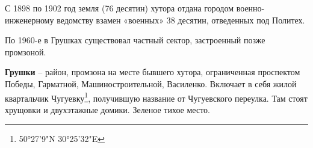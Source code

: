 С 1898 по 1902 год земля (76 десятин) хутора отдана городом военно-инженерному ведомству взамен «военных» 38 десятин, отведенных под Политех.

По 1960-е в Грушках существовал частный сектор, застроенный позже промзоной.\\

\medskip

\textbf{Грушки} – район, промзона на месте бывшего хутора, ограниченная проспектом Победы, Гарматной, Машиностроительной, Василенко. Включает в себя жилой квартальчик Чугуевку\footnote{50°27'9"N   30°25'32"E}, получившую название от Чугуевского переулка. Там стоят хрущовки и двухэтажные домики. Зеленое тихое место.
